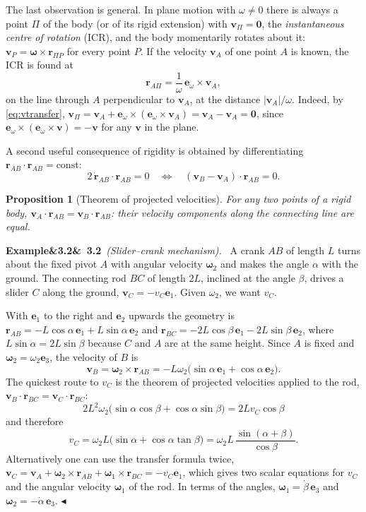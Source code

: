 \documentclass[11pt,a4paper,oneside]{report}
\numberwithin{equation}{chapter}
\newcommand{\vect}[1]{\bm{#1}}
\newcommand{\e}[1]{\vect{e}_{#1}}
\theoremstyle{plain}
\newtheorem{proposition}[theorem]{Proposition}
\theoremstyle{definition}
\theoremstyle{remark}
\newenvironment{example}[2]{%
  \par\addvspace{\bigskipamount}\noindent
  \textbf{Example\ifx&#1&\else~#1\fi}\ \textit{(#2).}\ \ignorespaces}%
  {\hfill$\blacktriangleleft$\par\addvspace{\bigskipamount}}
\begin{document}
The last observation is general. In plane motion with $\omega\neq0$ there is always a point $\Pi$ of the body (or of
its rigid extension) with $\vect v_\Pi=\vect 0$, the \emph{instantaneous centre of rotation} (ICR), and the body
momentarily rotates about it: $\vect v_P=\vect\omega\times\vect r_{\Pi P}$ for every point $P$. If the velocity
$\vect v_A$ of one point $A$ is known, the ICR is found at
\begin{equation}
  \vect r_{A\Pi}=\frac1\omega\,\e\omega\times\vect v_A ,
\end{equation}
on the line through $A$ perpendicular to $\vect v_A$, at the distance $|\vect v_A|/\omega$. Indeed, by
\eqref{eq:vtransfer}, $\vect v_\Pi=\vect v_A+\e\omega\times(\e\omega\times\vect v_A)=\vect v_A-\vect v_A=\vect 0$,
since $\e\omega\times(\e\omega\times\vect v)=-\vect v$ for any $\vect v$ in the plane.

A second useful consequence of rigidity is obtained by differentiating $\vect r_{AB}\cdot\vect r_{AB}=\text{const}$:
\[
  2\,\dot{\vect r}_{AB}\cdot\vect r_{AB}=0\quad\Longleftrightarrow\quad(\vect v_B-\vect v_A)\cdot\vect r_{AB}=0 .
\]
\begin{proposition}[Theorem of projected velocities]
For any two points of a rigid body, $\vect v_A\cdot\vect r_{AB}=\vect v_B\cdot\vect r_{AB}$: their velocity
components along the connecting line are equal.
\end{proposition}

\begin{example}{3.2}{Slider--crank mechanism}
A crank $AB$ of length $L$ turns about the fixed pivot $A$ with angular velocity $\vect\omega_2$ and makes the angle
$\alpha$ with the ground. The connecting rod $BC$ of length $2L$, inclined at the angle $\beta$, drives a slider $C$
along the ground, $\vect v_C=-v_C\e1$. Given $\omega_2$, we want $v_C$.

With $\e1$ to the right and $\e2$ upwards the geometry is
$\vect r_{AB}=-L\cos\alpha\,\e1+L\sin\alpha\,\e2$ and $\vect r_{BC}=-2L\cos\beta\,\e1-2L\sin\beta\,\e2$, where
$L\sin\alpha=2L\sin\beta$ because $C$ and $A$ are at the same height. Since $A$ is fixed and
$\vect\omega_2=\omega_2\e3$, the velocity of $B$ is
\[
  \vect v_B=\vect\omega_2\times\vect r_{AB}=-L\omega_2\big(\sin\alpha\,\e1+\cos\alpha\,\e2\big).
\]
The quickest route to $v_C$ is the theorem of projected velocities applied to the rod, $\vect v_B\cdot\vect r_{BC}=\vect v_C\cdot\vect r_{BC}$:
\[
  2L^2\omega_2\big(\sin\alpha\cos\beta+\cos\alpha\sin\beta\big)=2Lv_C\cos\beta
\]
and therefore
\[
  v_C=\omega_2L\big(\sin\alpha+\cos\alpha\tan\beta\big)=\omega_2L\,\frac{\sin(\alpha+\beta)}{\cos\beta}.
\]
Alternatively one can use the transfer formula twice,
$\vect v_C=\vect v_A+\vect\omega_2\times\vect r_{AB}+\vect\omega_1\times\vect r_{BC}=-v_C\e1$, which gives two scalar
equations for $v_C$ and the angular velocity $\vect\omega_1$ of the rod. In terms of the angles,
$\vect\omega_1=\dot\beta\,\e3$ and $\vect\omega_2=-\dot\alpha\,\e3$.
\end{example}
\end{document}
